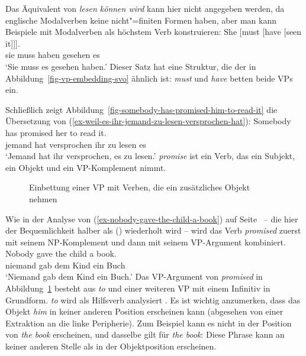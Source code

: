 Das Äquivalent von \emph{lesen können wird} kann hier nicht angegeben werden, da englische Modalverben
keine nicht"=finiten Formen haben, aber man kann Beispiele mit Modalverben als höchstem Verb konstruieren:
\ea
\gll She [must [have [seen it]]].\\
     sie \spacebr{}muss \spacebr{}haben \spacebr{}gesehen es\\
\glt `Sie muss es gesehen haben.'
\z
Dieser Satz hat eine Struktur, die der in Abbildung~\ref{fig-vp-embedding-svo} ähnlich ist:
\emph{must} und \emph{have} betten beide VPs ein.

Schließlich zeigt Abbildung~\vref{fig-somebody-has-promised-him-to-read-it} die Übersetzung von
(\ref{ex-weil-es-ihr-jemand-zu-lesen-versprochen-hat}):
\ea
\gll Somebody has promised her to read it.\\
     jemand hat versprochen ihr zu lesen es\\
\glt `Jemand hat ihr versprochen, es zu lesen.'
\z
\emph{promise} ist ein Verb, das ein Subjekt, ein Objekt und ein VP-Komplement nimmt.
\begin{figure}
\caption{\label{fig-somebody-has-promised-him-to-read-it}Einbettung einer VP mit Verben, die ein
  zusätzliches Objekt nehmen}
\end{figure}
Wie in der Analyse von (\ref{ex-nobody-gave-the-child-a-book}) auf
Seite~\pageref{ex-nobody-gave-the-child-a-book} -- die hier der Bequemlichkeit halber als () wiederholt wird
-- wird das Verb \emph{promised} zuerst mit seinem NP-Komplement und dann mit seinem VP-Argument kombiniert.
\ea
\label{ex-nobody-gave-the-child-a-book-three}
\gll Nobody gave the child a book.\\
     niemand gab dem Kind ein Buch\\
\glt `Niemand gab dem Kind ein Buch.'
\z
Das VP-Argument von \emph{promised} in Abbildung~\ref{fig-somebody-has-promised-him-to-read-it} besteht aus \emph{to} und einer weiteren VP mit einem Infinitiv in Grundform. \emph{to} wird
als Hilfsverb analysiert \parencites[]{GPS82a-u}[]{Sag2020a}.
Es ist wichtig anzumerken, dass das Objekt \emph{him} in keiner anderen Position erscheinen kann (abgesehen von
einer Extraktion an die linke Peripherie). Zum Beispiel kann es nicht in der Position von \emph{the book} erscheinen,
und dasselbe gilt für \emph{the book}: Diese Phrase kann an keiner anderen Stelle als in der
Objektposition erscheinen.

